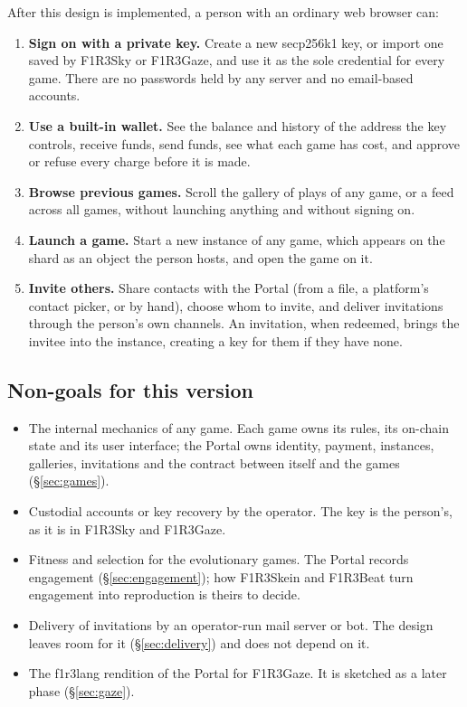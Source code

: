 \documentclass[11pt]{article}
\theoremstyle{definition}
\theoremstyle{remark}
\newcommand{\Sky}{F1R3Sky}
\newcommand{\Gz}{F1R3Gaze}
\begin{document}
After this design is implemented, a person with an ordinary web browser can:

\begin{enumerate}[leftmargin=*,itemsep=2pt]
\item \textbf{Sign on with a private key.} Create a new secp256k1 key, or import one
  saved by \Sky{} or \Gz{}, and use it as the sole credential for every game. There
  are no passwords held by any server and no email-based accounts.
\item \textbf{Use a built-in wallet.} See the balance and history of the address the
  key controls, receive funds, send funds, see what each game has cost, and approve
  or refuse every charge before it is made.
\item \textbf{Browse previous games.} Scroll the gallery of plays of any game, or a
  feed across all games, without launching anything and without signing on.
\item \textbf{Launch a game.} Start a new instance of any game, which appears on the
  shard as an object the person hosts, and open the game on it.
\item \textbf{Invite others.} Share contacts with the Portal (from a file, a
  platform's contact picker, or by hand), choose whom to invite, and deliver
  invitations through the person's own channels. An invitation, when redeemed, brings
  the invitee into the instance, creating a key for them if they have none.
\end{enumerate}

\subsection{Non-goals for this version}

\begin{itemize}[leftmargin=*,itemsep=2pt]
\item The internal mechanics of any game. Each game owns its rules, its on-chain
  state and its user interface; the Portal owns identity, payment, instances,
  galleries, invitations and the contract between itself and the games
  (\S\ref{sec:games}).
\item Custodial accounts or key recovery by the operator. The key is the person's,
  as it is in \Sky{} and \Gz{}.
\item Fitness and selection for the evolutionary games. The Portal records
  engagement (\S\ref{sec:engagement}); how F1R3Skein and F1R3Beat turn engagement
  into reproduction is theirs to decide.
\item Delivery of invitations by an operator-run mail server or bot. The design
  leaves room for it (\S\ref{sec:delivery}) and does not depend on it.
\item The f1r3lang rendition of the Portal for \Gz{}. It is sketched as a later phase
  (\S\ref{sec:gaze}).
\end{itemize}
\end{document}

